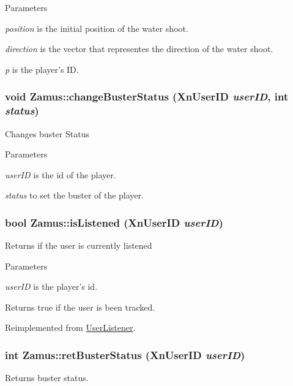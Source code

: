 \begin{DoxyParams}{Parameters}
\item[{\em position}]is the initial position of the water shoot. \item[{\em direction}]is the vector that representes the direction of the water shoot. \item[{\em p}]is the player's ID. \end{DoxyParams}
\hypertarget{classZamus_ac7edda8c30064bfafd67351f40ca4a5d}{
\subsubsection[{changeBusterStatus}]{\setlength{\rightskip}{0pt plus 5cm}void Zamus::changeBusterStatus (XnUserID {\em userID}, \/  int {\em status})}}
\label{classZamus_ac7edda8c30064bfafd67351f40ca4a5d}
Changes buster Status


\begin{DoxyParams}{Parameters}
\item[{\em userID}]is the id of the player. \item[{\em status}]to set the buster of the player. \end{DoxyParams}
\hypertarget{classZamus_ab76c23d1189599fd0cbbce9352b4faeb}{
\subsubsection[{isListened}]{\setlength{\rightskip}{0pt plus 5cm}bool Zamus::isListened (XnUserID {\em userID})}}
\label{classZamus_ab76c23d1189599fd0cbbce9352b4faeb}
Returns if the user is currently listened


\begin{DoxyParams}{Parameters}
\item[{\em userID}]is the player's id.\end{DoxyParams}
\begin{DoxyReturn}{Returns}
true if the user is been tracked. 
\end{DoxyReturn}


Reimplemented from \hyperlink{classUserListener_aea80d4da192afaf0329cf92e4489fd0a}{UserListener}.

\hypertarget{classZamus_ae2823178fa5fa30ddfa22e3b3ebd2332}{
\subsubsection[{retBusterStatus}]{\setlength{\rightskip}{0pt plus 5cm}int Zamus::retBusterStatus (XnUserID {\em userID})}}
\label{classZamus_ae2823178fa5fa30ddfa22e3b3ebd2332}
Returns buster status.


